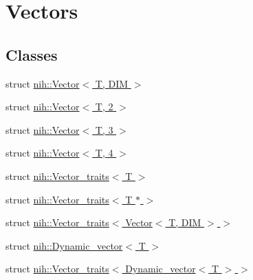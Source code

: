 \hypertarget{group__vectors}{
\section{\-Vectors}
\label{group__vectors}
}
\subsection*{\-Classes}
\begin{DoxyCompactItemize}
\item 
struct \hyperlink{structnih_1_1_vector}{nih\-::\-Vector$<$ T, D\-I\-M $>$}
\item 
struct \hyperlink{structnih_1_1_vector_3_01_t_00_012_01_4}{nih\-::\-Vector$<$ T, 2 $>$}
\item 
struct \hyperlink{structnih_1_1_vector_3_01_t_00_013_01_4}{nih\-::\-Vector$<$ T, 3 $>$}
\item 
struct \hyperlink{structnih_1_1_vector_3_01_t_00_014_01_4}{nih\-::\-Vector$<$ T, 4 $>$}
\item 
struct \hyperlink{structnih_1_1_vector__traits}{nih\-::\-Vector\-\_\-traits$<$ T $>$}
\item 
struct \hyperlink{structnih_1_1_vector__traits_3_01_t_01_5_01_4}{nih\-::\-Vector\-\_\-traits$<$ T $\ast$ $>$}
\item 
struct \hyperlink{structnih_1_1_vector__traits_3_01_vector_3_01_t_00_01_d_i_m_01_4_01_4}{nih\-::\-Vector\-\_\-traits$<$ Vector$<$ T, D\-I\-M $>$ $>$}
\item 
struct \hyperlink{structnih_1_1_dynamic__vector}{nih\-::\-Dynamic\-\_\-vector$<$ T $>$}
\item 
struct \hyperlink{structnih_1_1_vector__traits_3_01_dynamic__vector_3_01_t_01_4_01_4}{nih\-::\-Vector\-\_\-traits$<$ Dynamic\-\_\-vector$<$ T $>$ $>$}
\end{DoxyCompactItemize}
